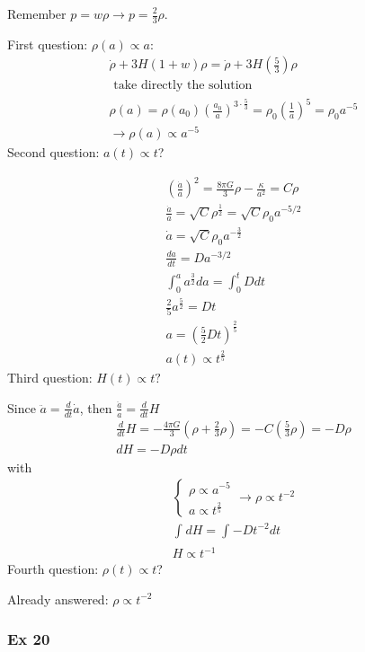 Remember $p = w\rho  \to  p = \frac{2}{3}\rho $. \par
First question: $\rho \left( a \right)\propto a $:
\begin{gather*}
\dot{\rho } + 3H\left( 1+w \right)\rho = \dot{\rho }+ 3H\left( \frac{5}{3} \right)\rho  \\
\text{ take directly the solution }\\
\rho \left( a \right) = \rho \left( a_{0} \right)\left( \frac{a_{0}}{a} \right)^{3 \cdot \frac{5}{3}} = \rho _{0} \left( \frac{1}{a} \right)^{5} = \rho _{0}a^{-5}\\
\to \rho\left( a \right)\propto a^{-5}
\end{gather*}
Second question: $a\left( t \right)\propto t$?\par
\begin{gather*}
	\left( \frac{\dot{a}}{a} \right)^{2} = \frac{8\pi G}{3}\rho  - \frac{\kappa }{a^{2}}= C \rho  \\
	\frac{\dot{a}}{a} = \sqrt{C}\rho ^{\frac{1}{2}} = \sqrt{C} \rho _{0} a^{-5/2}\\
	\dot{a} = \sqrt{C}\rho _{0} a^{-\frac{3}{2}} \\
	\frac{d a}{d t} = D a^{-3/2}\\
	\int_{0}^{a}{a^{\frac{3}{2}}da} = \int_{0}^{t}{ D dt}\\
	\frac{2}{5}a^{\frac{5}{2}} = D t\\
	a = \left( \frac{5}{2}D t \right)^{\frac{2}{5}}\\
	a\left( t \right)\propto t^{\frac{2}{5}}
\end{gather*}
Third question: $H\left( t \right)\propto t?$\par
Since $\ddot{a} = \frac{d }{d t} \dot{a}$, then $ \frac{\ddot{a}}{a} = \frac{d }{d t} H$
\begin{gather*}
\frac{d }{d t} H = - \frac{4\pi G}{3} \left( \rho  + \frac{2}{3}\rho  \right) = - C \left( \frac{5}{3} \rho  \right) = - D \rho  \\
dH = - D \rho dt
\end{gather*}
with 
\begin{gather*}
\begin{cases}
\rho  \propto a^{-5} \\
a \propto t^{\frac{2}{5}}
\end{cases} \to \rho \propto t^{-2} \\
\int_{}^{}{dH} = \int_{}^{}{- D t^{-2} dt}\\
H \propto t^{-1}
\end{gather*}
Fourth question: $\rho \left( t \right) \propto t$?\par
Already answered: $\rho \propto t^{-2}$

\subsubsection{Ex 20}



















